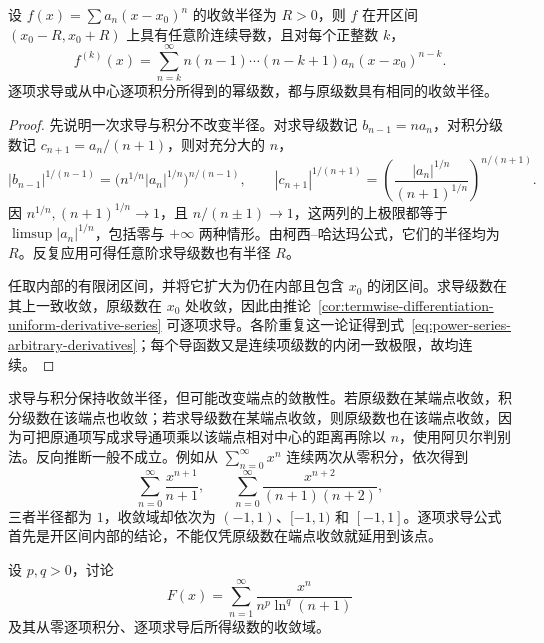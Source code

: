\documentclass[UTF8,12pt,a4paper,fontset=fandol]{ctexbook}
\begin{document}
\begin{theorem}[逐项求导及任意阶光滑性]
\label{thm:power-series-termwise-differentiation}
设 $f(x)=\sum a_n(x-x_0)^n$ 的收敛半径为 $R>0$，则 $f$ 在开区间 $(x_0-R,x_0+R)$ 上具有任意阶连续导数，且对每个正整数 $k$，
\begin{equation}
    f^{(k)}(x)=\sum_{n=k}^\infty
        n(n-1)\cdots(n-k+1)a_n(x-x_0)^{n-k}.
    \label{eq:power-series-arbitrary-derivatives}
\end{equation}
逐项求导或从中心逐项积分所得到的幂级数，都与原级数具有相同的收敛半径。
\end{theorem}

\begin{proof}
先说明一次求导与积分不改变半径。对求导级数记 $b_{n-1}=na_n$，对积分级数记 $c_{n+1}=a_n/(n+1)$，则对充分大的 $n$，
\[
    |b_{n-1}|^{1/(n-1)}
        =\bigl(n^{1/n}|a_n|^{1/n}\bigr)^{n/(n-1)},\qquad
    |c_{n+1}|^{1/(n+1)}
        =\left(\frac{|a_n|^{1/n}}{(n+1)^{1/n}}\right)^{n/(n+1)}.
\]
因 $n^{1/n},(n+1)^{1/n}\to1$，且 $n/(n\pm1)\to1$，这两列的上极限都等于 $\limsup|a_n|^{1/n}$，包括零与 $+\infty$ 两种情形。由柯西--哈达玛公式，它们的半径均为 $R$。反复应用可得任意阶求导级数也有半径 $R$。

任取内部的有限闭区间，并将它扩大为仍在内部且包含 $x_0$ 的闭区间。求导级数在其上一致收敛，原级数在 $x_0$ 处收敛，因此由推论~\ref{cor:termwise-differentiation-uniform-derivative-series} 可逐项求导。各阶重复这一论证得到式~\eqref{eq:power-series-arbitrary-derivatives}；每个导函数又是连续项级数的内闭一致极限，故均连续。
\end{proof}

求导与积分保持收敛半径，但可能改变端点的敛散性。若原级数在某端点收敛，积分级数在该端点也收敛；若求导级数在某端点收敛，则原级数也在该端点收敛，因为可把原通项写成求导通项乘以该端点相对中心的距离再除以 $n$，使用阿贝尔判别法。反向推断一般不成立。例如从 $\sum_{n=0}^\infty x^n$ 连续两次从零积分，依次得到
\[
    \sum_{n=0}^\infty\frac{x^{n+1}}{n+1},\qquad
    \sum_{n=0}^\infty\frac{x^{n+2}}{(n+1)(n+2)},
\]
三者半径都为 $1$，收敛域却依次为 $(-1,1)$、$[-1,1)$ 和 $[-1,1]$。逐项求导公式首先是开区间内部的结论，不能仅凭原级数在端点收敛就延用到该点。

\begin{example}
\label{ex:power-series-logarithmic-endpoint-changes}
设 $p,q>0$，讨论
\[
    F(x)=\sum_{n=1}^\infty\frac{x^n}{n^p\ln^q(n+1)}
\]
及其从零逐项积分、逐项求导后所得级数的收敛域。
\end{example}
\end{document}
